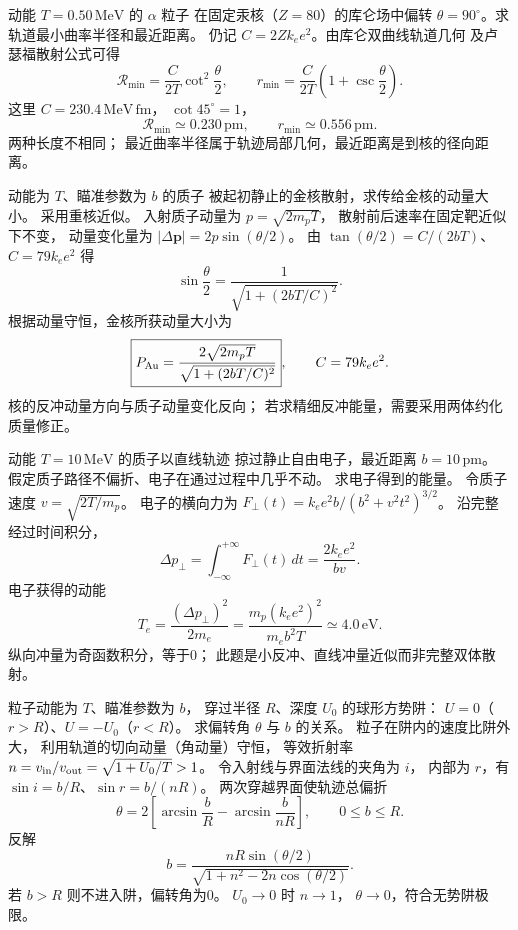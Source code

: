 动能 $T=0.50\,\mathrm{MeV}$ 的 $\alpha$ 粒子
在固定汞核（$Z=80$）的库仑场中偏转
$\theta=90^\circ$。求轨道最小曲率半径和最近距离。
\exsolution
仍记 $C=2Zk_e e^2$。由库仑双曲线轨道几何
及卢瑟福散射公式可得
\[
 \boxed{\mathcal R_{\min}=
 \frac C{2T}\cot^2\frac\theta2},\qquad
 \boxed{r_{\min}=
 \frac C{2T}\left(1+\csc\frac\theta2\right)}.
\]
这里 $C=230.4\,\mathrm{MeV\,fm}$，
$\cot45^\circ=1$，
\[
 \boxed{\mathcal R_{\min}\simeq0.230\,\mathrm{pm}},
 \qquad\boxed{r_{\min}\simeq0.556\,\mathrm{pm}}.
\]
\excheck 两种长度不相同；
最近曲率半径属于轨迹局部几何，最近距离是到核的径向距离。

动能为 $T$、瞄准参数为 $b$ 的质子
被起初静止的金核散射，求传给金核的动量大小。
采用重核近似。
\exsolution
入射质子动量为 $p=\sqrt{2m_pT}$，
散射前后速率在固定靶近似下不变，
动量变化量为
$|\Delta\boldsymbol p|=2p\sin(\theta/2)$。
由
$\tan(\theta/2)=C/(2bT)$、
$C=79k_e e^2$ 得
\[
 \sin\frac\theta2=
 \frac1{\sqrt{1+(2bT/C)^2}}.
\]
根据动量守恒，金核所获动量大小为
\[
 \boxed{P_{\rm Au}=
 \frac{2\sqrt{2m_pT}}{\sqrt{1+(2bT/C)^2}}},
 \qquad C=79k_e e^2.
\]
\excheck 核的反冲动量方向与质子动量变化反向；
若求精细反冲能量，需要采用两体约化质量修正。

动能 $T=10\,\mathrm{MeV}$ 的质子以直线轨迹
掠过静止自由电子，最近距离 $b=10\,\mathrm{pm}$。
假定质子路径不偏折、电子在通过过程中几乎不动。
求电子得到的能量。
\exsolution
令质子速度
$v=\sqrt{2T/m_p}$。
电子的横向力为
$F_\perp(t)=k_ee^2 b/(b^2+v^2t^2)^{3/2}$。
沿完整经过时间积分，
\[
 \Delta p_\perp=\int_{-\infty}^{+\infty}F_\perp(t)\,dt
 =\frac{2k_ee^2}{bv}.
\]
电子获得的动能
\[
 T_e=\frac{(\Delta p_\perp)^2}{2m_e}
 =\boxed{\frac{m_p(k_ee^2)^2}{m_eb^2T}
 \simeq4.0\,\mathrm{eV}}.
\]
\excheck 纵向冲量为奇函数积分，等于0；
此题是小反冲、直线冲量近似而非完整双体散射。

粒子动能为 $T$、瞄准参数为 $b$，
穿过半径 $R$、深度 $U_0$ 的球形方势阱：
$U=0$（$r>R$）、$U=-U_0$（$r<R$）。
求偏转角 $\theta$ 与 $b$ 的关系。
\exsolution
粒子在阱内的速度比阱外大，
利用轨道的切向动量（角动量）守恒，
等效折射率
$n=v_{\rm in}/v_{\rm out}
=\sqrt{1+U_0/T}>1$。
令入射线与界面法线的夹角为 $i$，
内部为 $r$，有
$\sin i=b/R$、$\sin r=b/(nR)$。
两次穿越界面使轨迹总偏折
\[
 \boxed{\theta=
 2\left[\arcsin\frac bR-
 \arcsin\frac b{nR}\right]},
 \qquad 0\le b\le R.
\]
反解
\[
 \boxed{b=\frac{nR\sin(\theta/2)}
 {\sqrt{1+n^2-2n\cos(\theta/2)}}}.
\]
若 $b>R$ 则不进入阱，偏转角为0。
\excheck $U_0\to0$ 时 $n\to1$，
$\theta\to0$，符合无势阱极限。

